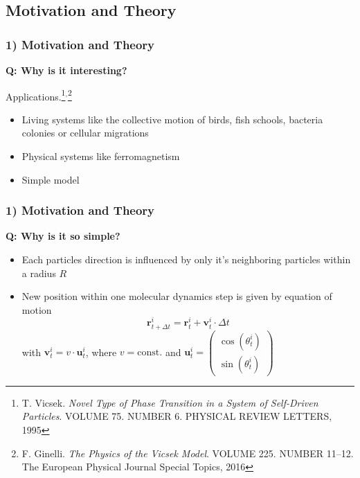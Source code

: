 \subsection{Motivation and Theory}

\begin{frame}
	\frametitle{1) Motivation and Theory}
	\textbf{Q: Why is it interesting?}
	
	Applications.\footnote{\tiny{T. Vicsek. \textit{Novel Type of Phase Transition in a System of Self-Driven Particles}. VOLUME 75. NUMBER 6. PHYSICAL REVIEW LETTERS, 1995}}$^,$\footnote{\tiny{F. Ginelli. \textit{The Physics of the Vicsek Model}. VOLUME 225. NUMBER 11–12. The European Physical Journal Special Topics, 2016}}
	\begin{itemize}
	    \item Living systems like the collective motion of birds, fish schools, bacteria colonies or cellular migrations 

	    \item Physical systems like ferromagnetism
	    
	    \item Simple model
	\end{itemize}
\end{frame}

\begin{frame}
	\frametitle{1) Motivation and Theory}
	\textbf{Q: Why is it so simple?}
	
	\begin{itemize}
	    \item Each particles direction is influenced by only it's neighboring particles within a radius $R$ 
	    
	    \item New position within one molecular dynamics step is given by equation of motion
	    	\begin{equation}
	        	\mathbf{r}_{t + \Delta t}^i = \mathbf{r}_t^i + \mathbf{v}_t^i \cdot \Delta t
	    	\end{equation} \noindent
	    with $\mathbf{v}_t^i = v \cdot \mathbf{u}_t^i$, where $v = \mathrm{const.}$ and $\mathbf{u}_t^i = \left( \begin{array}{c}
	         \cos{(\theta_t^i)}  \\
	         \sin{(\theta_t^i)}
	    \end{array} \right)$ 
	\end{itemize}
\end{frame}

